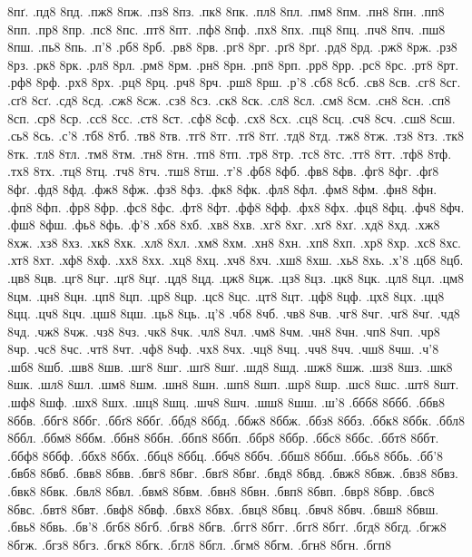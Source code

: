 {8пґ.
.пд8
8пд.
.пж8
8пж.
.пз8
8пз.
.пк8
8пк.
.пл8
8пл.
.пм8
8пм.
.пн8
8пн.
.пп8
8пп.
.пр8
8пр.
.пс8
8пс.
.пт8
8пт.
.пф8
8пф.
.пх8
8пх.
.пц8
8пц.
.пч8
8пч.
.пш8
8пш.
.пь8
8пь.
.п'8
.рб8
8рб.
.рв8
8рв.
.рг8
8рг.
.рґ8
8рґ.
.рд8
8рд.
.рж8
8рж.
.рз8
8рз.
.рк8
8рк.
.рл8
8рл.
.рм8
8рм.
.рн8
8рн.
.рп8
8рп.
.рр8
8рр.
.рс8
8рс.
.рт8
8рт.
.рф8
8рф.
.рх8
8рх.
.рц8
8рц.
.рч8
8рч.
.рш8
8рш.
.р'8
.сб8
8сб.
.св8
8св.
.сг8
8сг.
.сґ8
8сґ.
.сд8
8сд.
.сж8
8сж.
.сз8
8сз.
.ск8
8ск.
.сл8
8сл.
.см8
8см.
.сн8
8сн.
.сп8
8сп.
.ср8
8ср.
.сс8
8сс.
.ст8
8ст.
.сф8
8сф.
.сх8
8сх.
.сц8
8сц.
.сч8
8сч.
.сш8
8сш.
.сь8
8сь.
.с'8
.тб8
8тб.
.тв8
8тв.
.тг8
8тг.
.тґ8
8тґ.
.тд8
8тд.
.тж8
8тж.
.тз8
8тз.
.тк8
8тк.
.тл8
8тл.
.тм8
8тм.
.тн8
8тн.
.тп8
8тп.
.тр8
8тр.
.тс8
8тс.
.тт8
8тт.
.тф8
8тф.
.тх8
8тх.
.тц8
8тц.
.тч8
8тч.
.тш8
8тш.
.т'8
.фб8
8фб.
.фв8
8фв.
.фг8
8фг.
.фґ8
8фґ.
.фд8
8фд.
.фж8
8фж.
.фз8
8фз.
.фк8
8фк.
.фл8
8фл.
.фм8
8фм.
.фн8
8фн.
.фп8
8фп.
.фр8
8фр.
.фс8
8фс.
.фт8
8фт.
.фф8
8фф.
.фх8
8фх.
.фц8
8фц.
.фч8
8фч.
.фш8
8фш.
.фь8
8фь.
.ф'8
.хб8
8хб.
.хв8
8хв.
.хг8
8хг.
.хґ8
8хґ.
.хд8
8хд.
.хж8
8хж.
.хз8
8хз.
.хк8
8хк.
.хл8
8хл.
.хм8
8хм.
.хн8
8хн.
.хп8
8хп.
.хр8
8хр.
.хс8
8хс.
.хт8
8хт.
.хф8
8хф.
.хх8
8хх.
.хц8
8хц.
.хч8
8хч.
.хш8
8хш.
.хь8
8хь.
.х'8
.цб8
8цб.
.цв8
8цв.
.цг8
8цг.
.цґ8
8цґ.
.цд8
8цд.
.цж8
8цж.
.цз8
8цз.
.цк8
8цк.
.цл8
8цл.
.цм8
8цм.
.цн8
8цн.
.цп8
8цп.
.цр8
8цр.
.цс8
8цс.
.цт8
8цт.
.цф8
8цф.
.цх8
8цх.
.цц8
8цц.
.цч8
8цч.
.цш8
8цш.
.ць8
8ць.
.ц'8
.чб8
8чб.
.чв8
8чв.
.чг8
8чг.
.чґ8
8чґ.
.чд8
8чд.
.чж8
8чж.
.чз8
8чз.
.чк8
8чк.
.чл8
8чл.
.чм8
8чм.
.чн8
8чн.
.чп8
8чп.
.чр8
8чр.
.чс8
8чс.
.чт8
8чт.
.чф8
8чф.
.чх8
8чх.
.чц8
8чц.
.чч8
8чч.
.чш8
8чш.
.ч'8
.шб8
8шб.
.шв8
8шв.
.шг8
8шг.
.шґ8
8шґ.
.шд8
8шд.
.шж8
8шж.
.шз8
8шз.
.шк8
8шк.
.шл8
8шл.
.шм8
8шм.
.шн8
8шн.
.шп8
8шп.
.шр8
8шр.
.шс8
8шс.
.шт8
8шт.
.шф8
8шф.
.шх8
8шх.
.шц8
8шц.
.шч8
8шч.
.шш8
8шш.
.ш'8
.ббб8
8ббб.
.ббв8
8ббв.
.ббг8
8ббг.
.ббґ8
8ббґ.
.ббд8
8ббд.
.ббж8
8ббж.
.ббз8
8ббз.
.ббк8
8ббк.
.ббл8
8ббл.
.ббм8
8ббм.
.ббн8
8ббн.
.ббп8
8ббп.
.ббр8
8ббр.
.ббс8
8ббс.
.ббт8
8ббт.
.ббф8
8ббф.
.ббх8
8ббх.
.ббц8
8ббц.
.ббч8
8ббч.
.ббш8
8ббш.
.ббь8
8ббь.
.бб'8
.бвб8
8бвб.
.бвв8
8бвв.
.бвг8
8бвг.
.бвґ8
8бвґ.
.бвд8
8бвд.
.бвж8
8бвж.
.бвз8
8бвз.
.бвк8
8бвк.
.бвл8
8бвл.
.бвм8
8бвм.
.бвн8
8бвн.
.бвп8
8бвп.
.бвр8
8бвр.
.бвс8
8бвс.
.бвт8
8бвт.
.бвф8
8бвф.
.бвх8
8бвх.
.бвц8
8бвц.
.бвч8
8бвч.
.бвш8
8бвш.
.бвь8
8бвь.
.бв'8
.бгб8
8бгб.
.бгв8
8бгв.
.бгг8
8бгг.
.бгґ8
8бгґ.
.бгд8
8бгд.
.бгж8
8бгж.
.бгз8
8бгз.
.бгк8
8бгк.
.бгл8
8бгл.
.бгм8
8бгм.
.бгн8
8бгн.
.бгп8
}
